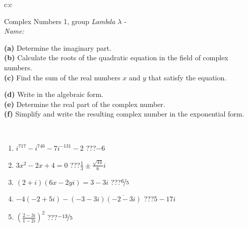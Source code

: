 \documentclass[10pt]{report}
\begin{document}
\begin{tabular}{c:c}
\begin{minipage}[c][104.5mm][t]{0.5\linewidth}
\begin{center}
\vspace{5mm}
{\huge Complex Numbers 1, group \textit{Lambda $\lambda$} -}\\[5mm]
\textit{Name:}\phantom{xxxxxxxxxxxxxxxxxxxxxxxxxxxxxxxxxxxxxxxxxxxxxxxxxxxxxxxxxxxxxxxxx}\\[5mm]
\begin{minipage}{0.95\linewidth}
\begin{center}
{\small \begin{minipage}{0.44\textwidth} \raggedright
\textbf{(a)} Determine the imaginary part. \\[1mm]
\textbf{(b)} Calculate the roots of the quadratic equation in the field of complex numbers. \\[1mm]
\textbf{(c)} Find the sum of the real numbers \(x\) and \(y\) that satisfy the equation. \end{minipage} \begin{minipage}{0.54\textwidth}
\textbf{(d)} Write in the algebraic form. \\[1mm]
\textbf{(e)} Determine the real part of the complex number. \\[1mm]
\textbf{(f)} Simplify and write the resulting complex number in the exponential form.
\end{minipage}
} \vspace{3mm}
\end{center}
\end{minipage}
\\[1mm]
\begin{minipage}{0.79\linewidth}
\begin{center}
\begin{varwidth}{\linewidth}
\setlength{\itemsep}{0pt}
\begin{enumerate}
\large
\item $i^{717}-i^{746}-7i^{-131}-2$\quad \dotfill\; ???\;\dotfill \quad $-6$
\item $3x^2-2x+4=0$\quad \dotfill\; ???\;\dotfill \quad $\frac{1}{3} \pm{}\frac{ \sqrt{44}}{6}i$
\item $(2+i)(6x-2yi)=3-3i$\quad \dotfill\; ???\;\dotfill \quad $\nicefrac{6}{5}$
\item $-4(-2+5i)-(-3-3i)\overline{(-2-3i)}$\quad \dotfill\; ???\;\dotfill \quad $5-17i$
\item $\left(\frac{2-3i}{1-2i}\right)^2$\quad \dotfill\; ???\;\dotfill \quad $\nicefrac{-13}{5}$

\end{enumerate}
\end{varwidth}
\end{center}
\end{minipage}
\end{center}
\end{minipage}
\end{tabular}
\end{document}
